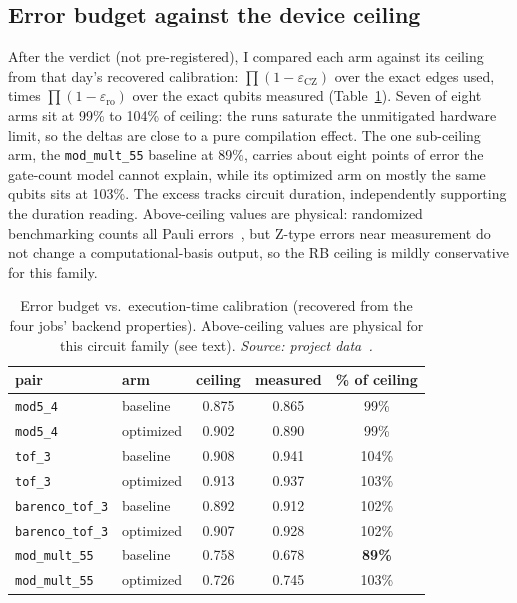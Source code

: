 \subsection{Error budget against the device ceiling}

After the verdict (not pre-registered), I compared each arm against its ceiling from that day's recovered calibration: $\prod(1-\varepsilon_{\mathrm{CZ}})$ over the exact edges used, times $\prod(1-\varepsilon_{\mathrm{ro}})$ over the exact qubits measured (Table~\ref{tab:ceilinghw}). Seven of eight arms sit at 99\% to 104\% of ceiling: the runs saturate the unmitigated hardware limit, so the deltas are close to a pure compilation effect. The one sub-ceiling arm, the \texttt{mod\_mult\_55} baseline at 89\%, carries about eight points of error the gate-count model cannot explain, while its optimized arm on mostly the same qubits sits at 103\%. The excess tracks circuit duration, independently supporting the duration reading. Above-ceiling values are physical: randomized benchmarking counts all Pauli errors~\cite{magesan2012rb}, but Z-type errors near measurement do not change a computational-basis output, so the RB ceiling is mildly conservative for this family.

\begin{table}[htbp]
\centering\small
\caption{Error budget vs.\ execution-time calibration (recovered from the four jobs' backend properties). Above-ceiling values are physical for this circuit family (see text). \emph{Source: project data~\cite{appliedrepo2026}.}}
\label{tab:ceilinghw}
\begin{tabular}{llccc}
\toprule
pair & arm & ceiling & measured & \% of ceiling \\
\midrule
\texttt{mod5\_4} & baseline & 0.875 & 0.865 & 99\% \\
\texttt{mod5\_4} & optimized & 0.902 & 0.890 & 99\% \\
\texttt{tof\_3} & baseline & 0.908 & 0.941 & 104\% \\
\texttt{tof\_3} & optimized & 0.913 & 0.937 & 103\% \\
\texttt{barenco\_tof\_3} & baseline & 0.892 & 0.912 & 102\% \\
\texttt{barenco\_tof\_3} & optimized & 0.907 & 0.928 & 102\% \\
\texttt{mod\_mult\_55} & baseline & 0.758 & 0.678 & \textbf{89\%} \\
\texttt{mod\_mult\_55} & optimized & 0.726 & 0.745 & 103\% \\
\bottomrule
\end{tabular}
\end{table}

